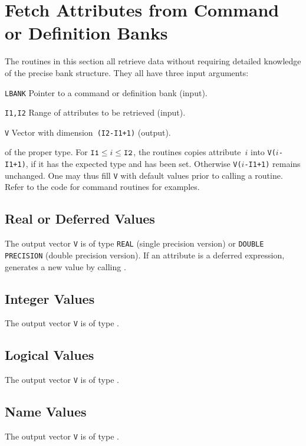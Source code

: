 \section{Fetch Attributes from Command or Definition Banks}
The routines in this section all retrieve data without requiring
detailed knowledge of the precise bank structure.
They all have three input arguments:
\begin{mylist}
\item[\tt LBANK]
Pointer to a command or definition bank (input).
\item[\tt I1,I2]
Range of attributes to be retrieved (input).
\item[\tt V]
Vector with dimension~{\tt (I2-I1+1)} (output).
\end{mylist}
of the proper type.
For ${\tt I1} \le i \le {\tt I2}$, the routines copies attribute~$i$
into {\tt V($i$-I1+1)}, if it has the expected type and has been set.
Otherwise {\tt V($i$-I1+1)} remains unchanged.
One may thus fill {\tt V} with default values prior to calling a
routine. 
Refer to the code for command routines for examples.

\subsection{Real or Deferred Values}
\label{UTGFLT}
The output vector {\tt V} is of type {\tt REAL} (single precision
version) or {\tt DOUBLE PRECISION} (double precision version).
If an attribute is a deferred expression,
 generates a new value by calling .

\subsection{Integer Values}
\label{UTGINT}
The output vector {\tt V} is of type .

\subsection{Logical Values}
\label{UTGLOG}
The output vector {\tt V} is of type .

\subsection{Name Values}
\label{UTGNAM}
The output vector {\tt V} is of type .

